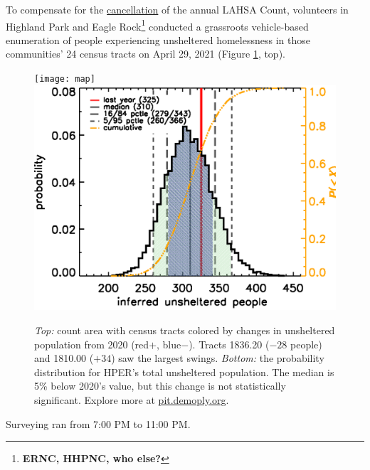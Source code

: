 \documentclass[11pt]{article}
\def\bfr{\bf\color{red}}
\begin{document}
 To compensate for the 
\href{https://laist.com/latest/post/20201209/LAHSA-cancels-2021-homeless-count-los-angeles-covid-19}
{cancellation} of the annual LAHSA Count, volunteers in Highland Park and Eagle 
Rock\footnote{{\bfr ERNC, HHPNC, who else?}} conducted a grassroots vehicle-based enumeration of people 
experiencing unsheltered homelessness in those communities' 24 census tracts on April 29, 2021 
(Figure \ref{fig:tcomp}, top).\begin{figure}
	\centering
	\texttt{[image: map]}
	\includegraphics[width=\linewidth, trim = 0cm 0cm 0cm 0cm]{hper2021Hist}
	\caption{{\it Top:} count area with census tracts colored by  
			changes in unsheltered population from 2020 (red$+$, blue$-$).
			Tracts 1836.20 ($-28$ people) and 1810.00 ($+34$) saw the largest swings. 
			{\it Bottom:} the probability distribution for HPER's total unsheltered 
			population. The median is 5\% below 2020's value, but this change is not 
			statistically significant.
			Explore more at \href{https://pit.demoply.org}{pit.demoply.org}.}
	\label{fig:tcomp}
\end{figure} Surveying ran from 7:00 PM to 11:00 PM.\\
\end{document}

